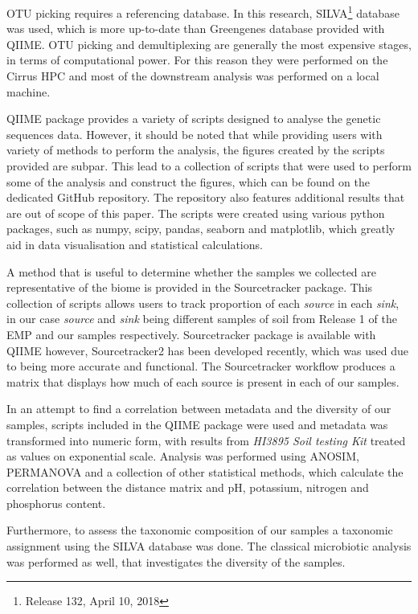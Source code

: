 \documentclass[12pt,twocolumn]{article} %
\begin{document}
\par 
OTU picking requires a referencing database. In this research, SILVA\footnote{Release 132, April 10, 2018}\cite{Quast2012} database was used, which is more up-to-date than Greengenes\cite{McDonald2012} database provided with QIIME. OTU picking and demultiplexing are generally the most expensive stages, in terms of computational power. For this reason they were performed on the Cirrus HPC and most of the downstream analysis was performed on a local machine. 
\par
QIIME package provides a variety of scripts designed to analyse the genetic sequences data. However, it should be noted that while providing users with variety of methods to perform the analysis, the figures created by the scripts provided are subpar. This lead to a collection of scripts that were used to perform some of the analysis and construct the figures, which can be found on the dedicated GitHub repository\cite{Anonymous2018}. The repository also features additional results that are out of scope of this paper. The scripts were created using various python packages, such as numpy, scipy, pandas, seaborn and matplotlib, which greatly aid in data visualisation and statistical calculations.
\par
A method that is useful to determine whether the samples we collected are representative of the biome is provided in the Sourcetracker package\cite{Knights2011}. This collection of scripts allows users to track proportion of each \textit{source} in each \textit{sink}, in our case \textit{source} and \textit{sink} being different samples of soil from Release 1 of the EMP and our samples respectively. Sourcetracker package is available with QIIME however, Sourcetracker2 has been developed recently, which was used due to being more accurate and functional. 
The Sourcetracker workflow produces a matrix that displays how much of each source is present in each of our samples.
\par
In an attempt to find a correlation between metadata and the diversity of our samples, scripts included in the QIIME package were used and metadata was transformed into numeric form, with results from \textit{HI3895 Soil testing Kit} treated as values on exponential scale. Analysis was performed using ANOSIM\cite{CLARKE1993}, PERMANOVA\cite{Tang2016} and a collection of other statistical methods, which calculate the correlation between the distance matrix and pH, potassium, nitrogen and phosphorus content.
\par
Furthermore, to assess the taxonomic composition of our samples a taxonomic assignment using the SILVA\cite{Quast2012} database was done. The classical microbiotic analysis was performed as well, that investigates the diversity of the samples.
%
%
\end{document}
